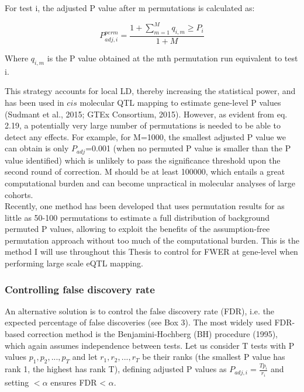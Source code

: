 For test i, the adjusted P value after m permutations is calculated as:

\begin{equation}\label{eq19:permutation_adjusted_pvalue}
    P_{adj,i}^{perm} = \frac{1+\sum_{m=1}^{M} q_{i,m} \geq P_i}{1+M}
\end{equation}

Where $q_{i,m}$ is the P value obtained at the mth permutation run equivalent to test i.  

This strategy accounts for local LD, thereby increasing the statistical power, and has been used in $cis$ molecular QTL mapping to estimate gene-level P values (Sudmant et al., 2015; GTEx Consortium, 2015).  
However, as evident from eq. 2.19, a potentially very large number of permutations is needed to be able to detect any effects.
For example, for M=1000, the smallest adjusted P value we can obtain is only $P_{adj}$=0.001 (when no permuted P value is smaller than the P value identified) which is unlikely to pass the significance threshold upon the second round of correction.
M should be at least 100000, which entails a great computational burden and can become unpractical in molecular analyses of large cohorts.\\

Recently, one method has been developed that uses permutation results for as little as 50-100 permutations to estimate a full distribution of background permuted P values, allowing to exploit the benefits of the assumption-free permutation approach without too much of the computational burden. 
This is the method I will use throughout this Thesis to control for FWER at gene-level when performing large scale eQTL mapping.

\subsubsection{Controlling false discovery rate}

An alternative solution is to control the false discovery rate (FDR), i.e. the expected percentage of false discoveries (see Box 3).
The most widely used FDR-based correction method is the Benjamini-Hochberg (BH) procedure (1995), which again assumes independence between tests. 
Let us consider T tests with P values $p_1, p_2, ..., p_T$ and let $r_1, r_2, ..., r_T$ be their ranks (the smallest P value has rank 1, the highest has rank T), defining adjusted P values as $P_{adj,i} = \frac{Tp_i}{r_i} $ and setting $<\alpha$ ensures FDR < $\alpha$.

